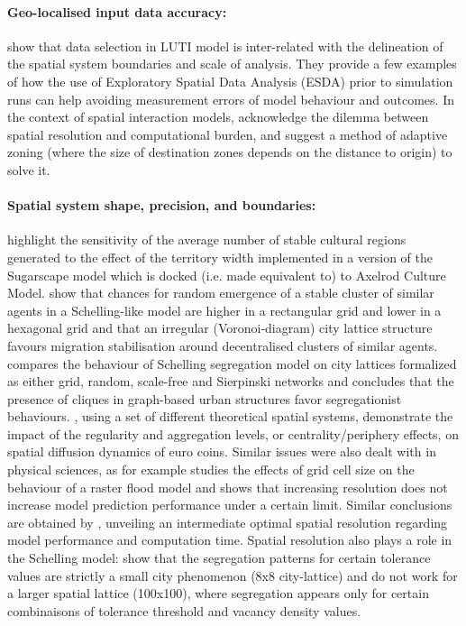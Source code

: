 \documentclass[3p,times,procedia]{elsarticle}
\begin{document}
\paragraph{Geo-localised input data accuracy:} \citet{Thomasetal2017} show that data selection in LUTI model is inter-related with the delineation of the spatial system boundaries and scale of analysis. They provide a few examples of how the use of Exploratory Spatial Data Analysis (ESDA) prior to simulation runs can help avoiding measurement errors of model behaviour and outcomes. In the context of spatial interaction models, \citet{hagen2012new} acknowledge the dilemma between spatial resolution and computational burden, and suggest a method of adaptive zoning (where the size of destination zones depends on the distance to origin) to solve it.

\paragraph{Spatial system shape, precision, and boundaries:} \citet{Axtelletal1996} highlight the sensitivity of the average number of stable cultural regions generated to the effect of the territory width implemented in a version of the Sugarscape model which is docked (i.e. made equivalent to) to Axelrod Culture Model. \citet{FlacheHegselmann2001} show that chances for random emergence of a stable cluster of similar agents in a Schelling-like model are higher in a rectangular grid and lower in a hexagonal grid and that an irregular (Voronoi-diagram) city lattice structure favours migration stabilisation around decentralised clusters of similar agents. \citet{Banos2012} compares the behaviour of Schelling segregation model on city lattices formalized as either grid, random, scale-free and Sierpinski networks and concludes that the presence of cliques in graph-based urban structures favor segregationist behaviours. \citet{LeTexierCaruso2017}, using a set of different theoretical spatial systems, demonstrate the impact of the regularity and aggregation levels, or centrality/periphery effects, on spatial diffusion dynamics of euro coins. Similar issues were also dealt with in physical sciences, as for example \cite{horritt2001effects} studies the effects of grid cell size on the behaviour of a raster flood model and shows that increasing resolution does not increase model prediction performance under a certain limit. Similar conclusions are obtained by \cite{vazquez2002effect}, unveiling an intermediate optimal spatial resolution regarding model performance and computation time. Spatial resolution also plays a role in the Schelling model: \citet{Singhetal2009} show that the segregation patterns for certain tolerance values are strictly a small city phenomenon (8x8 city-lattice) and do not work for a larger spatial lattice (100x100), where segregation appears only for certain combinaisons of tolerance threshold and vacancy density values.
\end{document}

